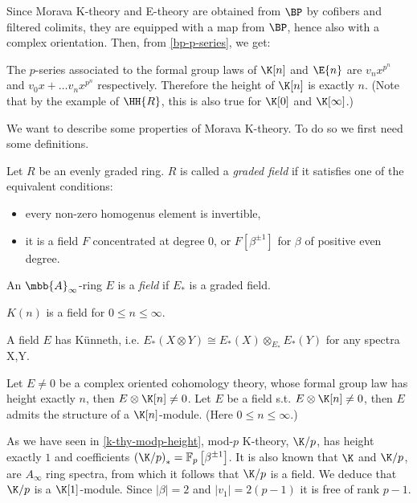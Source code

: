 Since Morava K-theory and E-theory are obtained from $\BP$ by cofibers and filtered colimits, they are equipped with a map from $\BP$, hence also with a complex orientation.
Then, from \ref{bp-p-series}, we get:

\begin{corollary}\label{k-e-p-series}
	The $p$-series associated to the formal group laws of $\K[n]$ and $\E{n}$ are $v_n x^{p^n}$ and $v_0 x + \dotsc v_n x^{p^n}$ respectively.
	Therefore the height of $\K[n]$ is exactly $n$.
	(Note that by the example of $\HH{R}$, this is also true for $\K[0]$ and $\K[\infty]$.)
\end{corollary}

We want to describe some properties of Morava K-theory.
To do so we first need some definitions.

\begin{definition}
	Let $R$ be an evenly graded ring.
	$R$ is called a \emph{graded field} if it satisfies one of the equivalent conditions:
	\begin{itemize}
		\item every non-zero homogenus element is invertible,
		\item it is a field $F$ concentrated at degree 0, or $F\left[\beta^{\pm1}\right]$ for $\beta$ of positive even degree.
	\end{itemize}
	An $\mbb{A}_\infty$-ring $E$ is a \emph{field} if $E_*$ is a graded field.
\end{definition}

\begin{example}
	$K\left(n\right)$ is a field for $0 \leq n \leq \infty$.
\end{example}

\begin{proposition}
	A field $E$ has K\"unneth, i.e. $E_*\left(X\otimes Y\right)\cong E_*\left(X\right)\otimes_{E_*}E_*\left(Y\right)$ for any spectra X,Y.
\end{proposition}

\begin{proposition}
	Let $E \neq 0$ be a complex oriented cohomology theory, whose formal group law has height exactly $n$, then $E \otimes \K[n] \neq 0$.
	Let $E$ be a field s.t. $E \otimes \K[n] \neq 0$, then $E$ admits the structure of a $\K[n]$-module.
	(Here $0 \leq n \leq \infty$.)
\end{proposition}

\begin{example}\label{k-thy-modp-morava}
	As we have seen in \ref{k-thy-modp-height}, mod-$p$ K-theory, $\K/p$, has height exactly $1$ and coefficients $\left(\K/p\right)_* = \mathbb{F}_p \left[\beta^{\pm 1}\right]$.
	It is also known that $\K$ and $\K/p$, are $A_\infty$ ring spectra, from which it follows that $\K/p$ is a field.
	We deduce that $\K/p$ is a $\K[1]$-module.
	Since $\left|\beta\right| = 2$ and $\left|v_1\right| = 2\left(p-1\right)$ it is free of rank $p-1$.
\end{example}


